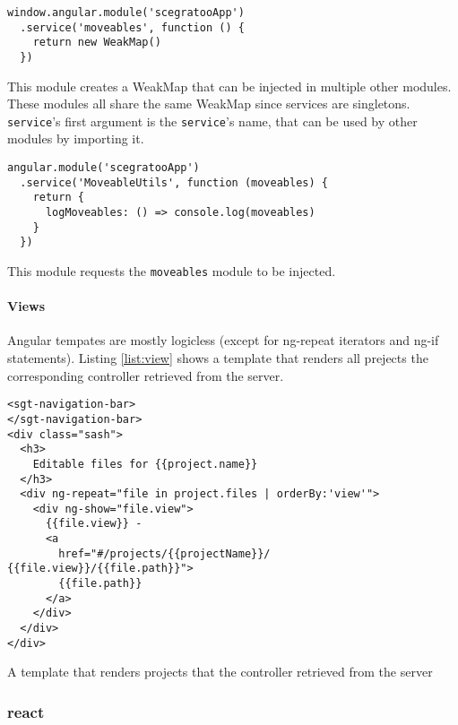 \begin{listing}
  \begin{verbatim}
window.angular.module('scegratooApp')
  .service('moveables', function () {
    return new WeakMap()
  })
  \end{verbatim}
  \caption{This module creates a WeakMap that can be injected in multiple other modules. These modules all share the same WeakMap since services are singletons. \texttt{service}'s first argument is the \texttt{service}'s name, that can be used by other modules by importing it.}
  \label{list:angularmodule}
\end{listing}

\begin{listing}
  \begin{verbatim}
angular.module('scegratooApp')
  .service('MoveableUtils', function (moveables) {
    return {
      logMoveables: () => console.log(moveables)
    }
  })
  \end{verbatim}
  \caption{This module requests the \texttt{moveables} module to be injected.}
  \label{list:depinj}
\end{listing}

\paragraph{Views}
\label{par:Views}

Angular tempates are mostly logicless
(except for ng-repeat iterators and ng-if statements). Listing \ref{list:view}
shows a template that renders all prejects the corresponding controller
retrieved from the server.

\begin{listing}
  \begin{verbatim}
<sgt-navigation-bar>
</sgt-navigation-bar>
<div class="sash">
  <h3>
    Editable files for {{project.name}}
  </h3>
  <div ng-repeat="file in project.files | orderBy:'view'">
    <div ng-show="file.view">
      {{file.view}} -
      <a
        href="#/projects/{{projectName}}/ {{file.view}}/{{file.path}}">
        {{file.path}}
      </a>
    </div>
  </div>
</div>
  \end{verbatim}
  \caption{A template that renders projects that the controller retrieved from the server}
  \label{list:view}
\end{listing}

\subsubsection{react}
\label{react}

